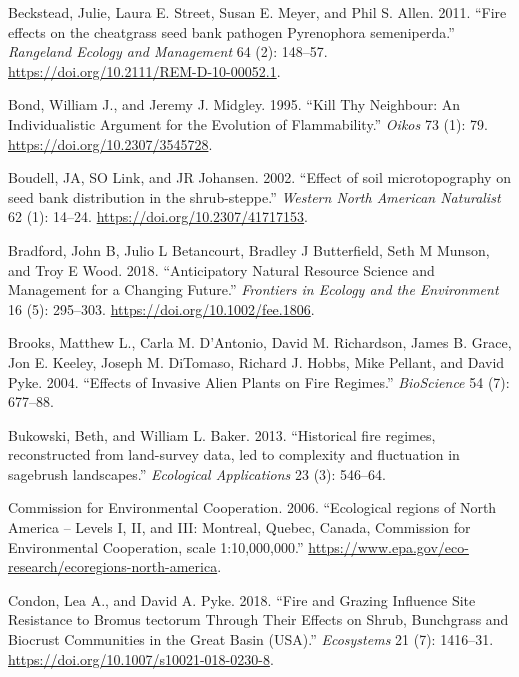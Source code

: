 \documentclass[
  12pt,
]{article}
\newlength{\cslhangindent}
\newlength{\cslentryspacingunit} %
\newenvironment{CSLReferences}[2] %
 {%
  \setlength{\parindent}{0pt}
  \ifodd #1
  \let\oldpar\par
  \def\par{\hangindent=\cslhangindent\oldpar}
  \fi
  \setlength{\parskip}{#2\cslentryspacingunit}
 }%
 {}
\begin{document}
\begin{CSLReferences}{1}{0}
\leavevmode{}%
Beckstead, Julie, Laura E. Street, Susan E. Meyer, and Phil S. Allen.
2011. {``{Fire effects on the cheatgrass seed bank pathogen Pyrenophora
semeniperda}.''} \emph{Rangeland Ecology and Management} 64 (2):
148--57. \url{https://doi.org/10.2111/REM-D-10-00052.1}.

\leavevmode{}%
Bond, William J., and Jeremy J. Midgley. 1995. {``{Kill Thy Neighbour:
An Individualistic Argument for the Evolution of Flammability}.''}
\emph{Oikos} 73 (1): 79. \url{https://doi.org/10.2307/3545728}.

\leavevmode{}%
Boudell, JA, SO Link, and JR Johansen. 2002. {``{Effect of soil
microtopography on seed bank distribution in the shrub-steppe}.''}
\emph{Western North American Naturalist} 62 (1): 14--24.
\url{https://doi.org/10.2307/41717153}.

\leavevmode{}%
Bradford, John B, Julio L Betancourt, Bradley J Butterfield, Seth M
Munson, and Troy E Wood. 2018. {``Anticipatory Natural Resource Science
and Management for a Changing Future.''} \emph{Frontiers in Ecology and
the Environment} 16 (5): 295--303.
\url{https://doi.org/10.1002/fee.1806}.

\leavevmode{}%
Brooks, Matthew L., Carla M. D'Antonio, David M. Richardson, James B.
Grace, Jon E. Keeley, Joseph M. DiTomaso, Richard J. Hobbs, Mike
Pellant, and David Pyke. 2004. {``{Effects of Invasive Alien Plants on
Fire Regimes}.''} \emph{BioScience} 54 (7): 677--88.

\leavevmode{}%
Bukowski, Beth, and William L. Baker. 2013. {``{Historical fire regimes,
reconstructed from land-survey data, led to complexity and fluctuation
in sagebrush landscapes}.''} \emph{Ecological Applications} 23 (3):
546--64.

\leavevmode{}%
Commission for Environmental Cooperation. 2006. {``{Ecological regions
of North America -- Levels I, II, and III: Montreal, Quebec, Canada,
Commission for Environmental Cooperation, scale 1:10,000,000}.''}
\url{https://www.epa.gov/eco-research/ecoregions-north-america}.

\leavevmode{}%
Condon, Lea A., and David A. Pyke. 2018. {``{Fire and Grazing Influence
Site Resistance to Bromus tectorum Through Their Effects on Shrub,
Bunchgrass and Biocrust Communities in the Great Basin (USA)}.''}
\emph{Ecosystems} 21 (7): 1416--31.
\url{https://doi.org/10.1007/s10021-018-0230-8}.


\end{CSLReferences}
\end{document}
